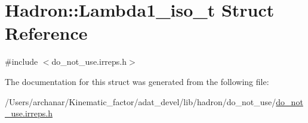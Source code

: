 \hypertarget{structHadron_1_1Lambda1__iso__t}{}\section{Hadron\+:\+:Lambda1\+\_\+iso\+\_\+t Struct Reference}
\label{structHadron_1_1Lambda1__iso__t}


{\ttfamily \#include $<$do\+\_\+not\+\_\+use.\+irreps.\+h$>$}



The documentation for this struct was generated from the following file\+:\begin{DoxyCompactItemize}
\item 
/\+Users/archanar/\+Kinematic\+\_\+factor/adat\+\_\+devel/lib/hadron/do\+\_\+not\+\_\+use/\mbox{\hyperlink{do__not__use_8irreps_8h}{do\+\_\+not\+\_\+use.\+irreps.\+h}}\end{DoxyCompactItemize}
